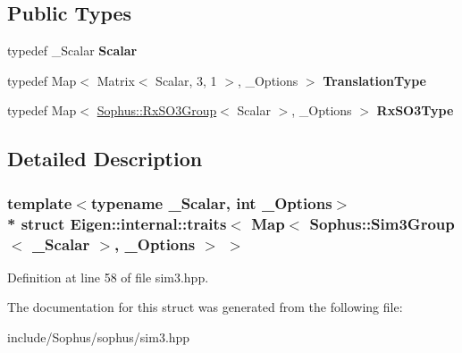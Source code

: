\subsection*{Public Types}
\begin{DoxyCompactItemize}
\item 
typedef \+\_\+\+Scalar {\bfseries Scalar}\hypertarget{struct_eigen_1_1internal_1_1traits_3_01_map_3_01_sophus_1_1_sim3_group_3_01___scalar_01_4_00_01___options_01_4_01_4_afcd1cb515492262eccb85f1e79b1118a}{}\label{struct_eigen_1_1internal_1_1traits_3_01_map_3_01_sophus_1_1_sim3_group_3_01___scalar_01_4_00_01___options_01_4_01_4_afcd1cb515492262eccb85f1e79b1118a}

\item 
typedef Map$<$ Matrix$<$ Scalar, 3, 1 $>$, \+\_\+\+Options $>$ {\bfseries Translation\+Type}\hypertarget{struct_eigen_1_1internal_1_1traits_3_01_map_3_01_sophus_1_1_sim3_group_3_01___scalar_01_4_00_01___options_01_4_01_4_a221f209e15bfcbdb266b363488dbe4d1}{}\label{struct_eigen_1_1internal_1_1traits_3_01_map_3_01_sophus_1_1_sim3_group_3_01___scalar_01_4_00_01___options_01_4_01_4_a221f209e15bfcbdb266b363488dbe4d1}

\item 
typedef Map$<$ \hyperlink{class_sophus_1_1_rx_s_o3_group}{Sophus\+::\+Rx\+S\+O3\+Group}$<$ Scalar $>$, \+\_\+\+Options $>$ {\bfseries Rx\+S\+O3\+Type}\hypertarget{struct_eigen_1_1internal_1_1traits_3_01_map_3_01_sophus_1_1_sim3_group_3_01___scalar_01_4_00_01___options_01_4_01_4_a805b8b91d146515bf0895eeffc26fce5}{}\label{struct_eigen_1_1internal_1_1traits_3_01_map_3_01_sophus_1_1_sim3_group_3_01___scalar_01_4_00_01___options_01_4_01_4_a805b8b91d146515bf0895eeffc26fce5}

\end{DoxyCompactItemize}


\subsection{Detailed Description}
\subsubsection*{template$<$typename \+\_\+\+Scalar, int \+\_\+\+Options$>$\\*
struct Eigen\+::internal\+::traits$<$ Map$<$ Sophus\+::\+Sim3\+Group$<$ \+\_\+\+Scalar $>$, \+\_\+\+Options $>$ $>$}



Definition at line 58 of file sim3.\+hpp.



The documentation for this struct was generated from the following file\+:\begin{DoxyCompactItemize}
\item 
include/\+Sophus/sophus/sim3.\+hpp\end{DoxyCompactItemize}
